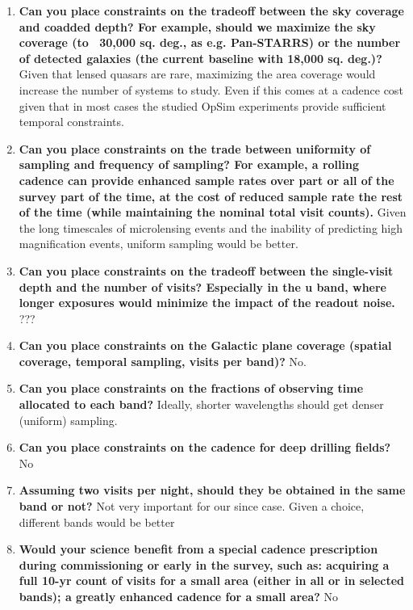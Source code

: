 \begin{enumerate}

\item \textbf{Can you place constraints on the tradeoff between the sky coverage and coadded depth?
For example, should we maximize the sky coverage (to ~30,000 sq. deg., as e.g. Pan-STARRS)
or the number of detected galaxies (the current baseline with 18,000 sq. deg.)?} Given that lensed quasars are rare, maximizing the area coverage would increase the number of systems to study. Even if this comes at a cadence cost given that in most cases the studied OpSim experiments provide sufficient temporal constraints.

\item \textbf{Can you place constraints on the trade between uniformity of sampling and frequency of 
sampling? For example, a rolling cadence can provide enhanced sample rates over part or all 
of the survey part of the time, at the cost of reduced sample rate the rest of the time (while 
maintaining the nominal total visit counts).} Given the long timescales of microlensing events and the inability of predicting high magnification events, uniform sampling would be better.


\item \textbf{Can you place constraints on the tradeoff between the single-visit depth and the number 
of visits? Especially in the u band, where longer exposures would minimize the impact of the 
readout noise.} ???

\item \textbf{Can you place constraints on the Galactic plane coverage (spatial coverage, temporal 
sampling, visits per band)?} No.

\item \textbf{Can you place constraints on the fractions of observing time allocated to each band?} Ideally, shorter wavelengths should get denser (uniform) sampling.

\item \textbf{Can you place constraints on the cadence for deep drilling fields?} No

\item \textbf{Assuming two visits per night, should they be obtained in the same band or not?} Not very important for our since case. Given a choice, different bands would be better

\item \textbf{Would your science benefit from a special cadence prescription during commissioning or 
early in the survey, such as: acquiring a full 10-yr count of visits for a small area (either in all or in selected bands); a greatly enhanced cadence for a small area?} No


\end{enumerate}
